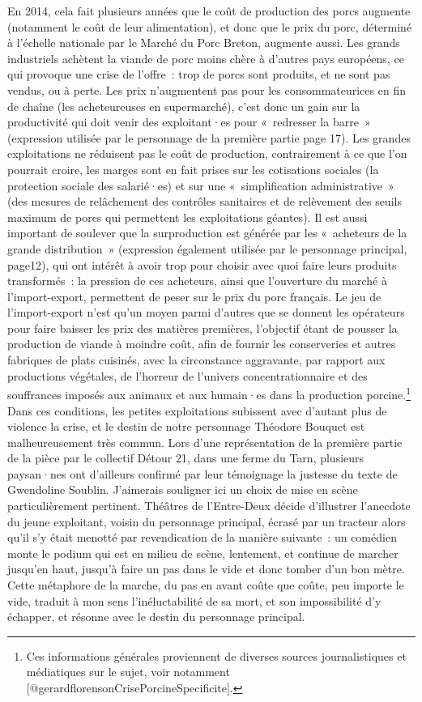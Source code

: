 \documentclass[
]{article}
\begin{document}
En 2014, cela fait plusieurs années que le coût de production des porcs augmente (notamment le coût de leur alimentation), et donc que le prix du porc, déterminé à l'échelle nationale par le Marché du Porc Breton, augmente aussi. Les grands industriels achètent la viande de porc moins chère à d'autres pays européens, ce qui provoque une crise de l'offre~: trop de porcs sont produits, et ne sont pas vendus, ou à perte. Les prix n'augmentent pas pour les consommateurices en fin de chaîne (les acheteureuses en supermarché), c'est donc un gain sur la productivité qui doit venir des exploitant·es pour «~redresser la barre~» (expression utilisée par le personnage de la première partie page 17). Les grandes exploitations ne réduisent pas le coût de production, contrairement à ce que l'on pourrait croire, les marges sont en fait prises sur les cotisations sociales (la protection sociale des salarié·es) et sur une «~simplification administrative~» (des mesures de relâchement des contrôles sanitaires et de relèvement des seuils maximum de porcs qui permettent les exploitations géantes). Il est aussi important de soulever que la surproduction est générée par les «~acheteurs de la grande distribution~» (expression également utilisée par le personnage principal, page12), qui ont intérêt à avoir trop pour choisir avec quoi faire leurs produits transformés~: la pression de ces acheteurs, ainsi que l'ouverture du marché à l'import-export, permettent de peser sur le prix du porc français. Le jeu de l'import-export n'est qu'un moyen parmi d'autres que se donnent les opérateurs pour faire baisser les prix des matières premières, l'objectif étant de pousser la production de viande à moindre coût, afin de fournir les conserveries et autres fabriques de plats cuisinés, avec la circonstance aggravante, par rapport aux productions végétales, de l'horreur de l'univers concentrationnaire et des souffrances imposés aux animaux et aux humain·es dans la production porcine.\footnote{Ces informations générales proviennent de diverses sources journalistiques et médiatiques sur le sujet, voir notamment {[}@gerardflorensonCrisePorcineSpecificite{]}.} Dans ces conditions, les petites exploitations subissent avec d'autant plus de violence la crise, et le destin de notre personnage Théodore Bouquet est malheureusement très commun. Lors d'une représentation de la première partie de la pièce par le collectif Détour 21, dans une ferme du Tarn, plusieurs paysan·nes ont d'ailleurs confirmé par leur témoignage la justesse du texte de Gwendoline Soublin. J'aimerais souligner ici un choix de mise en scène particulièrement pertinent. Théâtres de l'Entre-Deux décide d'illustrer l'anecdote du jeune exploitant, voisin du personnage principal, écrasé par un tracteur alors qu'il s'y était menotté par revendication de la manière suivante~: un comédien monte le podium qui est en milieu de scène, lentement, et continue de marcher jusqu'en haut, jusqu'à faire un pas dans le vide et donc tomber d'un bon mètre. Cette métaphore de la marche, du pas en avant coûte que coûte, peu importe le vide, traduit à mon sens l'inéluctabilité de sa mort, et son impossibilité d'y échapper, et résonne avec le destin du personnage principal.
\end{document}
